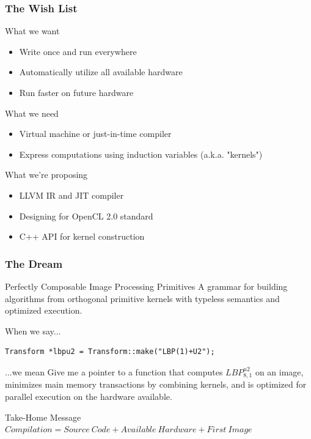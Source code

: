 \documentclass[12pt]{beamer}
\begin{document}
\begin{frame}
\frametitle{The Wish List}
\begin{block}{What we want}
  \begin{itemize}
  \item Write once and run everywhere
  \item Automatically utilize all available hardware
  \item Run faster on future hardware
  \end{itemize}
\end{block}
\pause
\begin{block}{What we need}
  \begin{itemize}
  \item Virtual machine or just-in-time compiler
  \item Express computations using induction variables (a.k.a. "kernels")
  \end{itemize}
\end{block}
\pause
\begin{block}{What we're proposing}
  \begin{itemize}
  \item LLVM IR and JIT compiler
  \item Designing for OpenCL 2.0 standard
  \item C++ API for kernel construction
  \end{itemize}
\end{block}
\end{frame}

\begin{frame}[fragile]
\frametitle{The Dream}
\begin{exampleblock}{Perfectly Composable Image Processing Primitives}
A grammar for building algorithms from orthogonal primitive kernels with typeless semantics and optimized execution.
\end{exampleblock}
\pause
\begin{block}{When we say...}
\begin{verbatim}
Transform *lbpu2 = Transform::make("LBP(1)+U2");
\end{verbatim}
\end{block}
\pause
\begin{block}{...we mean}
Give me a pointer to a function that computes $LBP_{8,1}^{u2}$ on an image,
minimizes main memory transactions by combining kernels,
and is optimized for parallel execution on the hardware available.
\end{block}
\pause
\begin{exampleblock}{Take-Home Message}
$Compilation = Source\ Code + Available\ Hardware + First\ Image$
\end{exampleblock}
\end{frame}
\end{document}
